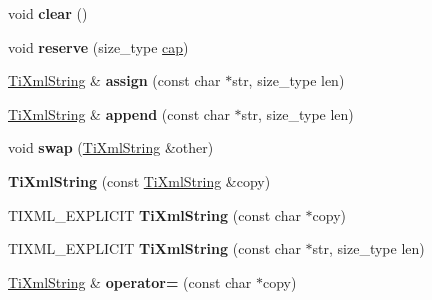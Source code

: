 \begin{DoxyCompactItemize}
\item 
\hypertarget{class_ti_xml_string_ab20e06e4c666abf3bdbfb3a1191d4888}{void {\bfseries clear} ()}\label{class_ti_xml_string_ab20e06e4c666abf3bdbfb3a1191d4888}

\item 
\hypertarget{class_ti_xml_string_a88ecf9f0f00cb5c67b6b637958d7049c}{void {\bfseries reserve} (size\+\_\+type \hyperlink{classcap}{cap})}\label{class_ti_xml_string_a88ecf9f0f00cb5c67b6b637958d7049c}

\item 
\hypertarget{class_ti_xml_string_ac72f3d9149b7812c1e6c59402014d0d5}{\hyperlink{class_ti_xml_string}{Ti\+Xml\+String} \& {\bfseries assign} (const char $\ast$str, size\+\_\+type len)}\label{class_ti_xml_string_ac72f3d9149b7812c1e6c59402014d0d5}

\item 
\hypertarget{class_ti_xml_string_ad44b21700d2ec24a511367b222b643fb}{\hyperlink{class_ti_xml_string}{Ti\+Xml\+String} \& {\bfseries append} (const char $\ast$str, size\+\_\+type len)}\label{class_ti_xml_string_ad44b21700d2ec24a511367b222b643fb}

\item 
\hypertarget{class_ti_xml_string_aa392cbc180752a79f007f4f9280c7762}{void {\bfseries swap} (\hyperlink{class_ti_xml_string}{Ti\+Xml\+String} \&other)}\label{class_ti_xml_string_aa392cbc180752a79f007f4f9280c7762}

\item 
\hypertarget{class_ti_xml_string_ac80fe17693a438c9ab2591664743fcb6}{{\bfseries Ti\+Xml\+String} (const \hyperlink{class_ti_xml_string}{Ti\+Xml\+String} \&copy)}\label{class_ti_xml_string_ac80fe17693a438c9ab2591664743fcb6}

\item 
\hypertarget{class_ti_xml_string_aa3b32bd2891a757c9f36c21db44c81d2}{T\+I\+X\+M\+L\+\_\+\+E\+X\+P\+L\+I\+C\+I\+T {\bfseries Ti\+Xml\+String} (const char $\ast$copy)}\label{class_ti_xml_string_aa3b32bd2891a757c9f36c21db44c81d2}

\item 
\hypertarget{class_ti_xml_string_a4b17ea5c5db986f14827223dfa8f1547}{T\+I\+X\+M\+L\+\_\+\+E\+X\+P\+L\+I\+C\+I\+T {\bfseries Ti\+Xml\+String} (const char $\ast$str, size\+\_\+type len)}\label{class_ti_xml_string_a4b17ea5c5db986f14827223dfa8f1547}

\item 
\hypertarget{class_ti_xml_string_ae0bc6147afc0ec2aa0da3a3c0a8fcfb0}{\hyperlink{class_ti_xml_string}{Ti\+Xml\+String} \& {\bfseries operator=} (const char $\ast$copy)}\label{class_ti_xml_string_ae0bc6147afc0ec2aa0da3a3c0a8fcfb0}


\end{DoxyCompactItemize}

